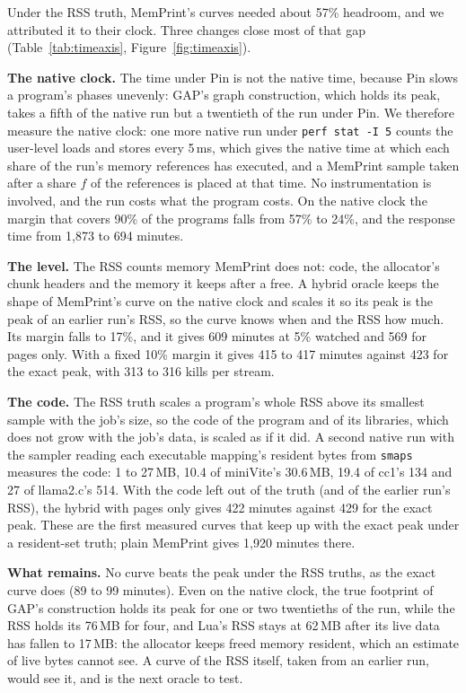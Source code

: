 \documentclass[11pt]{article}
\newcommand{\memprint}{MemPrint}
\newcommand{\figref}[1]{Figure~\ref{#1}}
\newcommand{\tabref}[1]{Table~\ref{#1}}
\begin{document}
Under the RSS truth, \memprint{}'s curves needed about 57\% headroom, and we attributed it to their clock. Three
changes close most of that gap (\tabref{tab:timeaxis}, \figref{fig:timeaxis}).

\textbf{The native clock.} The time under Pin is not the native time, because Pin slows a program's phases
unevenly: GAP's graph construction, which holds its peak, takes a fifth of the native run but a twentieth of the
run under Pin. We therefore measure the native clock: one more native run under \texttt{perf stat -I 5} counts the user-level loads and stores every
5\,ms, which gives the native time at which each share of the run's memory references has executed, and a
\memprint{} sample taken after a share $f$ of the references is placed at that time. No instrumentation is
involved, and the run costs what the program costs. On the native clock the margin that covers 90\% of the
programs falls from 57\% to 24\%, and the response time from 1{,}873 to 694 minutes.

\textbf{The level.} The RSS counts memory \memprint{} does not: code, the allocator's chunk headers and the memory
it keeps after a free. A hybrid oracle keeps the shape of \memprint{}'s curve on the native clock and scales it so
its peak is the peak of an earlier run's RSS, so the curve knows when and the RSS how much. Its margin falls to
17\%, and it gives 609 minutes at 5\% watched and 569 for pages only. With a fixed 10\% margin it gives 415 to 417
minutes against 423 for the exact peak, with 313 to 316 kills per stream.

\textbf{The code.} The RSS truth scales a program's whole RSS above its smallest sample with the job's size, so the
code of the program and of its libraries, which does not grow with the job's data, is scaled as if it did. A
second native run with the sampler reading each executable mapping's resident bytes from \texttt{smaps} measures
the code: 1 to 27\,MB, 10.4 of miniVite's 30.6\,MB, 19.4 of cc1's 134 and 27 of llama2.c's 514. With the code left
out of the truth (and of the earlier run's RSS), the hybrid with pages only gives 422 minutes against 429 for the
exact peak. These are the first measured curves that keep up
with the exact peak under a resident-set truth; plain \memprint{} gives 1{,}920 minutes there.

\textbf{What remains.} No curve beats the peak under the RSS truths, as the exact curve does (89 to 99 minutes).
Even on the native clock, the true footprint of GAP's construction holds its peak for one or two twentieths of
the run, while the RSS holds its 76\,MB for four, and Lua's RSS stays at 62\,MB after its live data has fallen to
17\,MB: the allocator keeps freed memory resident, which an estimate of live bytes cannot see. A curve of the RSS
itself, taken from an earlier run, would see it, and is the next oracle to test.
\end{document}
